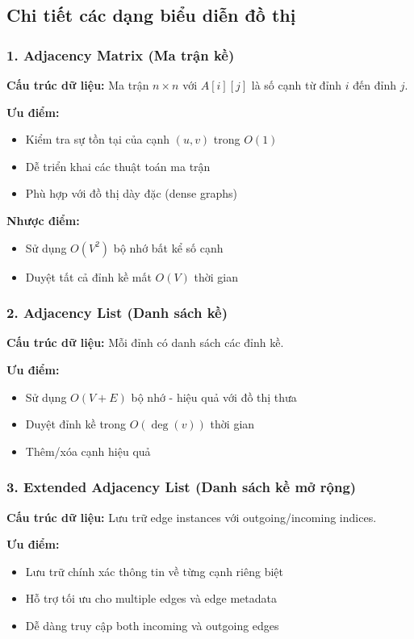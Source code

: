 \documentclass[12pt]{article}
\begin{document}
\subsection*{Chi tiết các dạng biểu diễn đồ thị}

\subsubsection*{1. Adjacency Matrix (Ma trận kề)}
\textbf{Cấu trúc dữ liệu:} Ma trận $n \times n$ với $A[i][j]$ là số cạnh từ đỉnh $i$ đến đỉnh $j$.

\textbf{Ưu điểm:}
\begin{itemize}
  \item Kiểm tra sự tồn tại của cạnh $(u, v)$ trong $O(1)$
  \item Dễ triển khai các thuật toán ma trận
  \item Phù hợp với đồ thị dày đặc (dense graphs)
\end{itemize}

\textbf{Nhược điểm:}
\begin{itemize}
  \item Sử dụng $O(V^2)$ bộ nhớ bất kể số cạnh
  \item Duyệt tất cả đỉnh kề mất $O(V)$ thời gian
\end{itemize}

\subsubsection*{2. Adjacency List (Danh sách kề)}
\textbf{Cấu trúc dữ liệu:} Mỗi đỉnh có danh sách các đỉnh kề.

\textbf{Ưu điểm:}
\begin{itemize}
  \item Sử dụng $O(V + E)$ bộ nhớ - hiệu quả với đồ thị thưa
  \item Duyệt đỉnh kề trong $O(\deg(v))$ thời gian
  \item Thêm/xóa cạnh hiệu quả
\end{itemize}

\subsubsection*{3. Extended Adjacency List (Danh sách kề mở rộng)}
\textbf{Cấu trúc dữ liệu:} Lưu trữ edge instances với outgoing/incoming indices.

\textbf{Ưu điểm:}
\begin{itemize}
  \item Lưu trữ chính xác thông tin về từng cạnh riêng biệt
  \item Hỗ trợ tối ưu cho multiple edges và edge metadata
  \item Dễ dàng truy cập both incoming và outgoing edges
\end{itemize}
\end{document}

